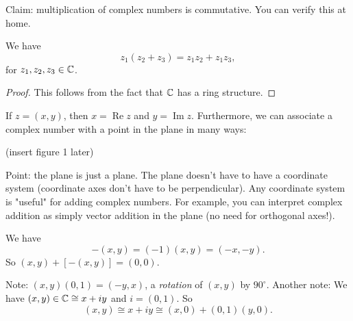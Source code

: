 Claim: multiplication of complex numbers is commutative. You can verify this at home.

\begin{theorem}
   We have \[
       z_1(z_2+z_3)=z_1z_2+z_1z_3,
   \]
   for $z_1,z_2,z_3 \in \mathbb{C}$. 
\end{theorem}
\begin{proof}
    This follows from the fact that $\mathbb{C}$ has a ring structure.
\end{proof}

\begin{definition}
    If $z=(x,y)$, then $x=\operatorname{Re}z$ and $y=\operatorname{Im}z.$ Furthermore, we can associate a complex number with a point in the plane in many ways:
\end{definition}
(insert figure 1 later)

\vspace{3mm}

Point: the plane is just a plane. The plane doesn't have to have a coordinate system (coordinate axes don't have to be perpendicular). Any coordinate system is "useful" for adding complex numbers. For example, you can interpret complex addition as simply vector addition in the plane (no need for orthogonal axes!).

\begin{definition}
    We have \[
        -(x,y)=(-1)(x,y)=(-x,-y).
    \]
    So $(x,y)+[-(x,y)]=(0,0)$.
\end{definition}

Note: $(x,y)(0,1)=(-y,x)$, a \textit{rotation} of $(x,y)$ by $90^{\circ}$.
Another note: We have $(x,y)\in\mathbb{C} \cong x+iy$ and $i=(0,1).$ So 
\[
(x,y) \cong x+iy \cong (x,0)+(0,1)(y,0).
\]
